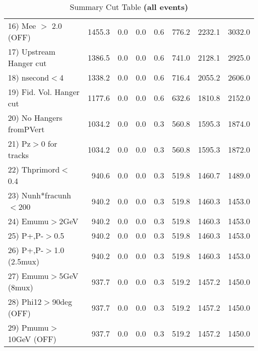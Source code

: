 \begin{table}[h!]
{{\begin{tabular}{||l||r|r|r|r|r||r||r||}
 16) Mee $>$ 2.0  (OFF)   &    1455.3 &       0.0 &       0.0 &       0.6 &     776.2 &    2232.1 &    3032.0 \\
 17) Upstream Hanger cut  &    1386.5 &       0.0 &       0.0 &       0.6 &     741.0 &    2128.1 &    2925.0 \\
 18) nsecond$<$4          &    1338.2 &       0.0 &       0.0 &       0.6 &     716.4 &    2055.2 &    2606.0 \\
 19) Fid. Vol. Hanger cut &    1177.6 &       0.0 &       0.0 &       0.6 &     632.6 &    1810.8 &    2152.0 \\
 20) No Hangers fromPVert &    1034.2 &       0.0 &       0.0 &       0.3 &     560.8 &    1595.3 &    1874.0 \\
 21) Pz$>$0 for tracks    &    1034.2 &       0.0 &       0.0 &       0.3 &     560.8 &    1595.3 &    1872.0 \\
 22) Thprimord$<$0.4      &     940.6 &       0.0 &       0.0 &       0.3 &     519.8 &    1460.7 &    1489.0 \\
 23) Nunh*fracunh$<$200   &     940.2 &       0.0 &       0.0 &       0.3 &     519.8 &    1460.3 &    1453.0 \\
 24) Emumu$>$2GeV         &     940.2 &       0.0 &       0.0 &       0.3 &     519.8 &    1460.3 &    1453.0 \\
 25) P+,P-$>$0.5          &     940.2 &       0.0 &       0.0 &       0.3 &     519.8 &    1460.3 &    1453.0 \\
 26) P+,P-$>$1.0 (2.5mux) &     940.2 &       0.0 &       0.0 &       0.3 &     519.8 &    1460.3 &    1453.0 \\
 27) Emumu$>$5GeV  (8mux) &     937.7 &       0.0 &       0.0 &       0.3 &     519.2 &    1457.2 &    1450.0 \\
 28) Phi12$>$90deg  (OFF) &     937.7 &       0.0 &       0.0 &       0.3 &     519.2 &    1457.2 &    1450.0 \\
 29) Pmumu$>$10GeV  (OFF) &     937.7 &       0.0 &       0.0 &       0.3 &     519.2 &    1457.2 &    1450.0 \\
 \hline
 \hline
 \end{tabular}
 \caption{Summary Cut Table \textbf{ (all events)}}
 \label{tab-sumcut}
 }}
 \end{table}
 \endinput
